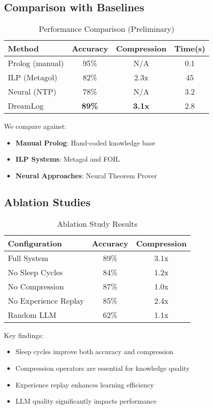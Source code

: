 \documentclass[10pt,conference]{IEEEtran}
\begin{document}
\subsection{Comparison with Baselines}

\begin{table}[h]
\centering
\caption{Performance Comparison (Preliminary)}
\label{tab:comparison}
\begin{tabular}{|l|c|c|c|}
\hline
Method & Accuracy & Compression & Time(s) \\
\hline
Prolog (manual) & 95\% & N/A & 0.1 \\
ILP (Metagol) & 82\% & 2.3x & 45 \\
Neural (NTP) & 78\% & N/A & 3.2 \\
DreamLog & \textbf{89\%} & \textbf{3.1x} & 2.8 \\
\hline
\end{tabular}
\end{table}

We compare against:
\begin{itemize}
\item \textbf{Manual Prolog}: Hand-coded knowledge base
\item \textbf{ILP Systems}: Metagol and FOIL
\item \textbf{Neural Approaches}: Neural Theorem Prover
\end{itemize}

\subsection{Ablation Studies}

\begin{table}[h]
\centering
\caption{Ablation Study Results}
\label{tab:ablation}
\begin{tabular}{|l|c|c|}
\hline
Configuration & Accuracy & Compression \\
\hline
Full System & 89\% & 3.1x \\
No Sleep Cycles & 84\% & 1.2x \\
No Compression & 87\% & 1.0x \\
No Experience Replay & 85\% & 2.4x \\
Random LLM & 62\% & 1.1x \\
\hline
\end{tabular}
\end{table}

Key findings:
\begin{itemize}
\item Sleep cycles improve both accuracy and compression
\item Compression operators are essential for knowledge quality
\item Experience replay enhances learning efficiency
\item LLM quality significantly impacts performance
\end{itemize}
\end{document}

